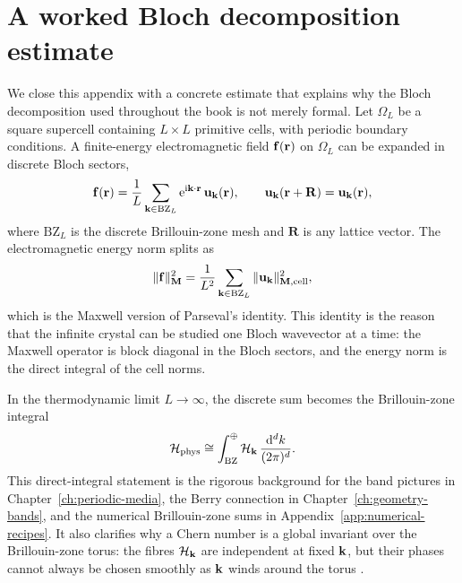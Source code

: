 \section{A worked Bloch decomposition estimate}
\label{sec:appA-bloch-decomposition-estimate}

We close this appendix with a concrete estimate that explains why the
Bloch decomposition used throughout the book is not merely formal.  Let
$\Omega_L$ be a square supercell containing $L\times L$ primitive cells,
with periodic boundary conditions.  A finite-energy electromagnetic field
$\mathbf{f}(\mathbf{r})$ on $\Omega_L$ can be expanded in discrete Bloch sectors,
\begin{equation}\label{eq:appA-finite-bloch-expansion}
  \mathbf{f}(\mathbf{r})=\frac{1}{L}\sum_{\mathbf{k}\in\mathrm{BZ}_L}
  \mathrm{e}^{\mathrm{i}\mathbf{k}\cdot\mathbf{r}}\,\mathbf{u}_{\mathbf{k}}(\mathbf{r}),
  \qquad
  \mathbf{u}_{\mathbf{k}}(\mathbf{r}+\mathbf{R})=\mathbf{u}_{\mathbf{k}}(\mathbf{r}),
\end{equation}
where $\mathrm{BZ}_L$ is the discrete Brillouin-zone mesh and
$\mathbf{R}$ is any lattice vector.  The electromagnetic energy norm splits
as
\begin{equation}\label{eq:appA-bloch-parseval}
  \|\mathbf{f}\|_{\mathbf{M}}^2
  = \frac{1}{L^2}\sum_{\mathbf{k}\in\mathrm{BZ}_L}
  \|\mathbf{u}_{\mathbf{k}}\|_{\mathbf{M},\mathrm{cell}}^2,
\end{equation}
which is the Maxwell version of Parseval's identity.  This identity is
the reason that the infinite crystal can be studied one Bloch wavevector
at a time: the Maxwell operator is block diagonal in the Bloch sectors,
and the energy norm is the direct integral of the cell norms.

In the thermodynamic limit $L\to\infty$, the discrete sum becomes the
Brillouin-zone integral
\begin{equation}\label{eq:appA-direct-integral-limit}
  \mathcal{H}_{\mathrm{phys}}
  \cong \int_{\mathrm{BZ}}^{\oplus}\mathcal{H}_{\mathbf{k}}\,
  \frac{\mathrm{d}^d k}{(2\pi)^d}.
\end{equation}
This direct-integral statement is the rigorous background for the band
pictures in Chapter~\ref{ch:periodic-media}, the Berry connection in
Chapter~\ref{ch:geometry-bands}, and the numerical Brillouin-zone
sums in Appendix~\ref{app:numerical-recipes}.  It also clarifies why a
Chern number is a global invariant over the Brillouin-zone torus: the
fibres $\mathcal{H}_{\mathbf{k}}$ are independent at fixed $\mathbf{k}$, but
their phases cannot always be chosen smoothly as $\mathbf{k}$ winds around
the torus \cite{gangaraj2016berry,ozawa2018topological}.

